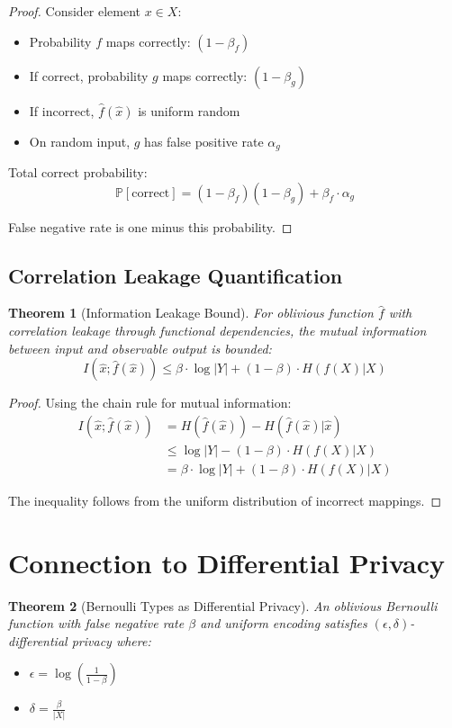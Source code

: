 \documentclass[11pt]{article}
\newtheorem{theorem}{Theorem}[section]
\newcommand{\Obv}[1]{\widehat{#1}}
\newcommand{\Prob}[1]{\mathbb{P}[#1]}
\newcommand{\Entropy}[1]{H(#1)}
\newcommand{\MI}[2]{I(#1;#2)}
\begin{document}
\begin{proof}
Consider element $x \in X$:
\begin{itemize}
    \item Probability $f$ maps correctly: $(1-\beta_f)$
    \item If correct, probability $g$ maps correctly: $(1-\beta_g)$
    \item If incorrect, $\Obv{f}(\Obv{x})$ is uniform random
    \item On random input, $g$ has false positive rate $\alpha_g$
\end{itemize}

Total correct probability:
\[
\Prob{\text{correct}} = (1-\beta_f)(1-\beta_g) + \beta_f \cdot \alpha_g
\]

False negative rate is one minus this probability.
\end{proof}

\subsection{Correlation Leakage Quantification}

\begin{theorem}[Information Leakage Bound]
For oblivious function $\Obv{f}$ with correlation leakage through functional dependencies, the mutual information between input and observable output is bounded:
\[
\MI{\Obv{x}}{\Obv{f}(\Obv{x})} \leq \beta \cdot \log|Y| + (1-\beta) \cdot \Entropy{f(X)|X}
\]
\end{theorem}

\begin{proof}
Using the chain rule for mutual information:
\begin{align}
\MI{\Obv{x}}{\Obv{f}(\Obv{x})} &= \Entropy{\Obv{f}(\Obv{x})} - \Entropy{\Obv{f}(\Obv{x})|\Obv{x}}\\
&\leq \log|Y| - (1-\beta) \cdot \Entropy{f(X)|X}\\
&= \beta \cdot \log|Y| + (1-\beta) \cdot \Entropy{f(X)|X}
\end{align}

The inequality follows from the uniform distribution of incorrect mappings.
\end{proof}

\section{Connection to Differential Privacy}

\begin{theorem}[Bernoulli Types as Differential Privacy]
An oblivious Bernoulli function with false negative rate $\beta$ and uniform encoding satisfies $(\epsilon, \delta)$-differential privacy where:
\begin{itemize}
    \item $\epsilon = \log\left(\frac{1}{1-\beta}\right)$
    \item $\delta = \frac{\beta}{|X|}$
\end{itemize}
\end{theorem}
\end{document}

